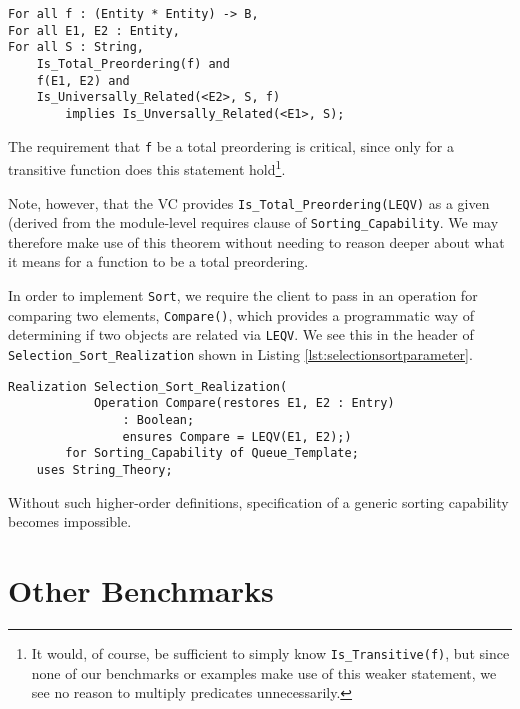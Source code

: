 \begin{lstlisting}[float=h,language=resolve,caption={A Useful \texttt{Is\_Universally\_Related} theorem\label{lst:universallyrelatedtheorem}}]
For all f : (Entity * Entity) -> B,
For all E1, E2 : Entity,
For all S : String,
	Is_Total_Preordering(f) and
	f(E1, E2) and
	Is_Universally_Related(<E2>, S, f)
		implies Is_Unversally_Related(<E1>, S);
\end{lstlisting}

The requirement that \texttt{f} be a total preordering is critical, since only for a transitive function does this statement hold\footnote{It would, of course, be sufficient to simply know \texttt{Is\_Transitive(f)}, but since none of our benchmarks or examples make use of this weaker statement, we see no reason to multiply predicates unnecessarily.}.

Note, however, that the VC provides \texttt{Is\_Total\_Preordering(LEQV)} as a given (derived from the module-level requires clause of \texttt{Sorting\_Capability}.  We may therefore make use of this theorem without needing to reason deeper about what it means for a function to be a total preordering.

In order to implement \texttt{Sort}, we require the client to pass in an operation for comparing two elements, \texttt{Compare()}, which provides a programmatic way of determining if two objects are related via \texttt{LEQV}.  We see this in the header of \texttt{Selection\_Sort\_Realization} shown in Listing \ref{lst:selectionsortparameter}.

\begin{lstlisting}[float=h,language=resolve,caption={\texttt{Selection\_Sort\_Realization} taking an operation that implements \texttt{LEQV}\label{lst:selectionsortparameter}}]
Realization Selection_Sort_Realization(
			Operation Compare(restores E1, E2 : Entry) 
				: Boolean;
				ensures Compare = LEQV(E1, E2);)
		for Sorting_Capability of Queue_Template;
	uses String_Theory;
\end{lstlisting}

Without such higher-order definitions, specification of a generic sorting capability becomes impossible.


\section{Other Benchmarks}

